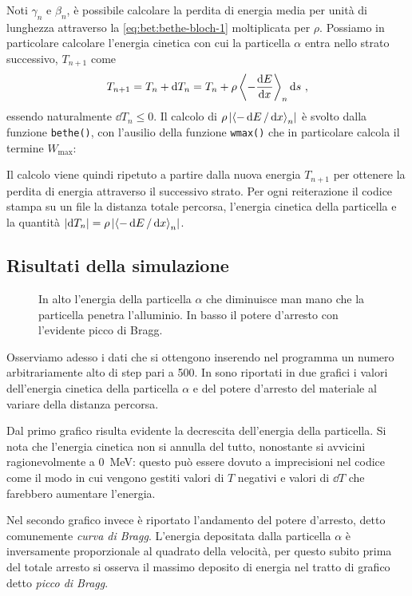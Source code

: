         Noti $\gamma_n$ e $\beta_n$, è possibile calcolare la perdita di energia media per unità di lunghezza attraverso la \eqref{eq:bet:bethe-bloch-1} moltiplicata per $\rho$. Possiamo in particolare calcolare l'energia cinetica con cui la particella $\alpha$ entra nello strato successivo, $T_{n + 1}$ come
        \begin{equation*}
            T_{n + 1} = T_n + \dd{T_n} = T_n + \rho\, {\left\langle - \dv{E}{x} \right\rangle}_n \dd{s}
            \,,
        \end{equation*}
        essendo naturalmente $\dd{T_n} \leq 0$. Il calcolo di $\rho\,\abs{{\left\langle - \dd{E} / \dd{x} \right\rangle}_n}$ è svolto dalla funzione \texttt{bethe()}, con l'ausilio della funzione \texttt{wmax()} che in particolare calcola il termine $W_\text{max}$:
        

        Il calcolo viene quindi ripetuto a partire dalla nuova energia $T_{n + 1}$ per ottenere la perdita di energia attraverso il successivo strato. Per ogni reiterazione il codice stampa su un file la distanza totale percorsa, l'energia cinetica della particella e la quantità $\abs{\dd{T_n}} = \rho\,\abs{{\left\langle - \dd{E} / \dd{x} \right\rangle}_n}$.

    \subsection{Risultati della simulazione}
        \begin{figure}
            \centering
            
            
            \caption{In alto l'energia della particella $\alpha$ che diminuisce man mano che la particella penetra l'alluminio. In basso il potere d'arresto con l'evidente picco di Bragg.}
            \label{fig:bet:alpha}
        \end{figure}
        Osserviamo adesso i dati che si ottengono inserendo nel programma un numero arbitrariamente alto di step pari a \num{500}. In  sono riportati in due grafici i valori dell'energia cinetica della particella $\alpha$ e del potere d'arresto del materiale al variare della distanza percorsa.
        
        Dal primo grafico risulta evidente la decrescita dell'energia della particella. Si nota che l'energia cinetica non si annulla del tutto, nonostante si avvicini ragionevolmente a \SI{0}{\mega\eV}: questo può essere dovuto a imprecisioni nel codice come il modo in cui vengono gestiti valori di $T$ negativi e valori di $\dd{T}$ che farebbero aumentare l'energia.

        Nel secondo grafico invece è riportato l'andamento del potere d'arresto, detto comunemente \emph{curva di Bragg}. L'energia depositata dalla particella $\alpha$ è inversamente proporzionale al quadrato della velocità, per questo subito prima del totale arresto si osserva il massimo deposito di energia nel tratto di grafico detto \emph{picco di Bragg}.